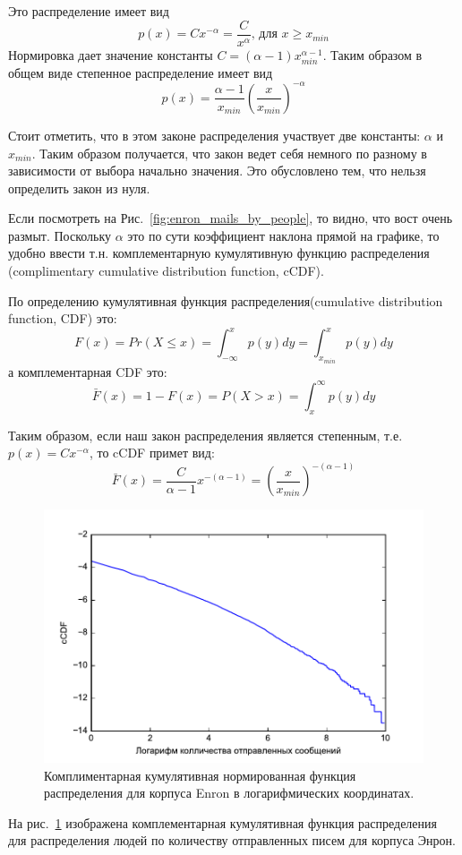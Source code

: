 Это распределение имеет вид \cite{zhukov} $$ p(x) = Cx^{-\alpha} = \frac{C}{x^\alpha} \text{, для } x \ge x_{min} $$ 
Нормировка дает значение константы $C = (\alpha - 1) x_{min}^{\alpha - 1}$.
Таким образом в общем виде степенное распределение имеет вид $$p(x) = \frac{\alpha - 1}{x_{min}} \left( \frac{x}{x_{min}} \right)^{-\alpha}$$

Стоит отметить, что в этом законе распределения участвует две константы: $\alpha$ и $x_{min}$. Таким образом получается, что закон ведет себя немного по разному в зависимости от выбора начально значения. Это обусловлено тем, что нельзя определить закон из нуля.

Если посмотреть на Рис.~\ref{fig:enron_mails_by_people}, то видно, что вост очень размыт. Поскольку $\alpha$ это по сути коэффициент наклона прямой на графике, то удобно ввести т.н. комплементарную кумулятивную функцию распределения (complimentary cumulative distribution function, cCDF).

По определению кумулятивная функция распределения(cumulative distribution function, CDF) это: 
$$ F(x) = Pr(X \le x) = \int_{-\infty}^x p(y)dy = \int_{x_{min}}^x p(y)dy $$
а комплементарная CDF это:
$$ \bar F(x) = 1 - F(x) = P(X > x) = \int_x^\infty p(y)dy $$

Таким образом, если наш закон распределения является степенным, т.е. $p(x) = Cx^{-\alpha}$, то cCDF примет вид:
$$ \bar F(x) = \frac{C}{\alpha - 1} x^{-(\alpha - 1)} = 
\left( \frac{x}{x_{min}} \right)^{-(\alpha - 1)}$$

\begin{figure}[H]
 \includegraphics{recources/mailes_by_people_enron_ccdf}
 \caption{Комплиментарная кумулятивная нормированная функция распределения для корпуса Enron в логарифмических координатах.}
 \label{fig:enron_mails_by_people_ccdf}
\end{figure}

На рис.~\ref{fig:enron_mails_by_people_ccdf} изображена комплементарная кумулятивная функция распределения для распределения людей по количеству отправленных писем для корпуса Энрон.



